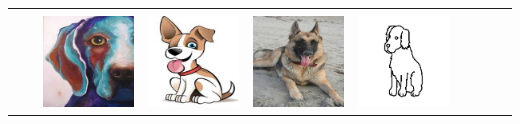 \begin{table}[htbp]
\begin{tabularx}{\textwidth}{lcYYYYYYYY}
       \addlinespace
        &   &  &  &  &  & &  & & \\
       & & \includegraphics[height=\imagequadsize, width=\imagequadsize]{Figures/Chapter2/PACS/dog_1.jpg} &  \includegraphics[height=\imagequadsize, width=\imagequadsize]{Figures/Chapter2/PACS/dog_2.jpg} &  \includegraphics[height=\imagequadsize, width=\imagequadsize]{Figures/Chapter2/PACS/dog_3.jpg} &  \includegraphics[height=\imagequadsize, width=\imagequadsize]{Figures/Chapter2/PACS/dog_4.png} & &  & & \\

\end{tabularx}
\end{table}
